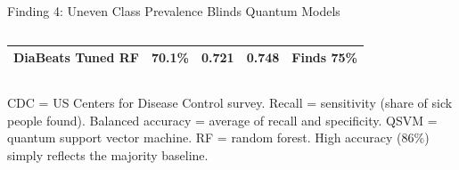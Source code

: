 \documentclass[aspectratio=169,10pt,t,xcolor={table,dvipsnames}]{beamer}
\newcommand{\gval}[1]{\textcolor{qgreen}{\textbf{#1}}}
\newcommand{\pfoot}[1]{\vfill{\raggedright\tiny\color{qslate}#1\par}}
\begin{document}
\begin{frame}{Finding 4: Uneven Class Prevalence Blinds Quantum Models}
\begin{columns}[T]
{\begin{tabular}{lcccc}
        DiaBeats Tuned RF      & 70.1\% & \gval{0.721} & \gval{0.748} & \gval{Finds 75\%} \\
        \bottomrule
      \end{tabular}}
      \vspace{4pt}
  \end{columns}
  \pfoot{CDC = US Centers for Disease Control survey. Recall = sensitivity (share of sick people found). Balanced accuracy = average of recall and specificity. QSVM = quantum support vector machine. RF = random forest. High accuracy (86\%) simply reflects the majority baseline.}
\end{frame}
\end{document}
